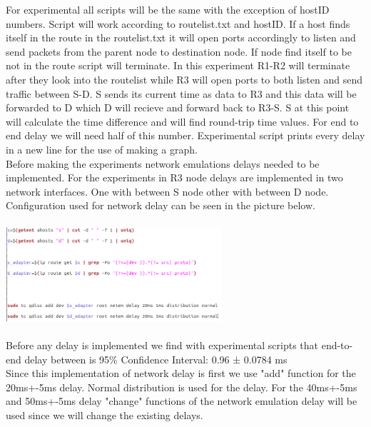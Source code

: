 \documentclass[conference]{IEEEtran}
\begin{document}
For experimental all scripts will be the same with the exception of hostID numbers. Script will work according to routelist.txt and hostID. If a host finds itself in the route in the routelist.txt it will open ports accordingly to listen and send packets from the parent node to destination node. If node find itself to be not in the route script will terminate. In this experiment R1-R2 will terminate after they look into the routelist while R3 will open ports to both listen and send traffic between S-D. S sends its current time as data to R3 and this data will be forwarded to D which D will recieve and forward back to R3-S. S at this point will calculate the time difference and will find round-trip time values. For end to end delay we will need half of this number. Experimental script prints every delay in a new line for the use of making a graph.\\

Before making the experiments network emulations delays needed to be implemented. For the experiments in R3 node delays are implemented in two network interfaces. One with between S node other with between D node.\\

Configuration used for network delay can be seen in the picture below.\\\qquad \\

\includegraphics[width = 80mm, height = 35mm]{configure.png}\\ \qquad \\

Before any delay is implemented we find with experimental scripts that end-to-end delay between is 95\% Confidence Interval: 0.96 ± 0.0784 ms\\

Since this implementation of network delay is first we use "add" function for the 20ms+-5ms delay. Normal distribution is used for the delay. For the 40ms+-5ms and 50ms+-5ms delay "change" functions of the network emulation delay will be used since we will change the existing delays.\\
\end{document}
